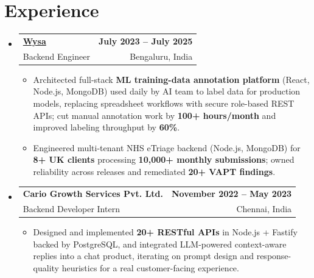 \documentclass[letterpaper,10pt]{article}
\makeatletter
\newcommand{\resumeItem}[1]{
  \item\small{#1\vspace{-1pt}}
}
\newcommand{\resumeSubheading}[4]{
  \vspace{1pt}\item
    \begin{tabular*}{0.985\textwidth}[t]{l@{\extracolsep{\fill}}r}
      \textbf{#1} & \textbf{\small #2} \\
      {\small\color{ResumeSlate} #3} & {\small\color{ResumeSlate} #4} \\
    \end{tabular*}\vspace{-6pt}
}
\newcommand{\resumeSubHeadingListStart}{\begin{itemize}[leftmargin=0.0in, label={}, itemsep=2pt, topsep=2pt]}
\newcommand{\resumeSubHeadingListEnd}{\end{itemize}}
\newcommand{\resumeItemListStart}{\begin{itemize}[leftmargin=0.18in, itemsep=2pt, topsep=1pt]}
\newcommand{\resumeItemListEnd}{\end{itemize}\vspace{-4pt}}
\makeatother
\begin{document}
\section{Experience}
\resumeSubHeadingListStart
  \resumeSubheading
    {\href{https://www.wysa.io}{Wysa}}{July 2023 -- July 2025}
    {Backend Engineer}{Bengaluru, India}
    \resumeItemListStart
      \resumeItem{Architected full-stack \textbf{ML training-data annotation platform} (React, Node.js, MongoDB) used daily by AI team to label data for production models, replacing spreadsheet workflows with secure role-based REST APIs; cut manual annotation work by \textbf{100+ hours/month} and improved labeling throughput by \textbf{60\%}.}
      \resumeItem{Engineered multi-tenant NHS eTriage backend (Node.js, MongoDB) for \textbf{8+ UK clients} processing \textbf{10{,}000+ monthly submissions}; owned reliability across releases and remediated \textbf{20+ VAPT findings}.}
    \resumeItemListEnd
  \resumeSubheading
    {Cario Growth Services Pvt. Ltd.}{November 2022 -- May 2023}
    {Backend Developer Intern}{Chennai, India}
    \resumeItemListStart
      \resumeItem{Designed and implemented \textbf{20+ RESTful APIs} in Node.js + Fastify backed by PostgreSQL, and integrated LLM-powered context-aware replies into a chat product, iterating on prompt design and response-quality heuristics for a real customer-facing experience.}
    \resumeItemListEnd
\resumeSubHeadingListEnd
\vspace{-4pt}
\end{document}
